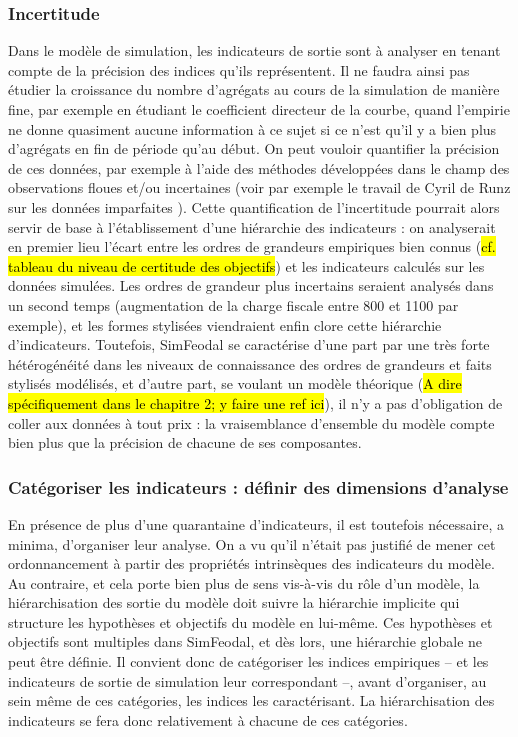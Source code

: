 \subsubsection{Incertitude}\label{sssec:incertitude}
Dans le modèle de simulation, les indicateurs de sortie sont à analyser en tenant compte de la précision des indices qu'ils représentent.
Il ne faudra ainsi pas étudier la croissance  du nombre d'agrégats au cours de la simulation de manière fine, par exemple en étudiant le coefficient directeur de la courbe, quand l'empirie ne donne quasiment aucune information à ce sujet si ce n'est qu'il y a bien plus d'agrégats en fin de période qu'au début.
On peut vouloir quantifier la précision de ces données, par exemple à l'aide des méthodes développées dans le champ des observations floues et/ou incertaines (voir par exemple le travail de Cyril de Runz sur les données \og imparfaites\fg{} \autocite{de2008imperfection}).
Cette quantification de l'incertitude pourrait alors servir de base à l'établissement d'une hiérarchie des indicateurs :
on analyserait en premier lieu l'écart entre les ordres de grandeurs empiriques bien connus (\hl{cf. tableau du niveau de certitude des objectifs}) et les indicateurs calculés sur les données simulées.
Les ordres de grandeur plus incertains seraient analysés dans un second temps (augmentation de la charge fiscale entre 800 et 1100 par exemple), et les formes stylisées viendraient enfin clore cette hiérarchie d'indicateurs.
Toutefois, SimFeodal se caractérise d'une part par une très forte hétérogénéité dans les niveaux de connaissance des ordres de grandeurs et faits stylisés modélisés, et d'autre part, se voulant un modèle théorique (\hl{A dire spécifiquement dans le chapitre 2; y faire une ref ici}), il n'y a pas d'obligation de \og coller aux données\fg{} à tout prix :
la vraisemblance d'ensemble du modèle compte bien plus que la précision de chacune de ses composantes.


\subsubsection{Catégoriser les indicateurs : définir des dimensions d'analyse}
En présence de plus d'une quarantaine d'indicateurs, il est toutefois nécessaire, a minima, d'organiser leur analyse.
On a vu qu'il n'était pas justifié de mener cet ordonnancement à partir des propriétés intrinsèques des indicateurs du modèle.
Au contraire, et cela porte bien plus de sens vis-à-vis du rôle d'un modèle, la hiérarchisation des sortie du modèle doit suivre la hiérarchie implicite qui structure les hypothèses et objectifs du modèle en lui-même.
Ces hypothèses et objectifs sont multiples dans SimFeodal, et dès lors, une hiérarchie globale ne peut être définie.
Il convient donc de catégoriser les indices empiriques -- et les indicateurs de sortie de simulation leur correspondant --, avant d'organiser, au sein même de ces catégories, les indices les caractérisant.
La hiérarchisation des indicateurs se fera donc relativement à chacune de ces catégories.

